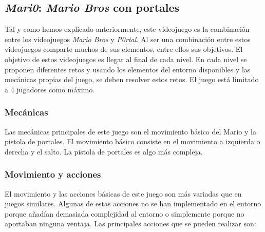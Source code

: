 \subsection{\textit{Mari0}: \textit{Mario Bros} con portales}

Tal y como hemos explicado anteriormente, este videojuego es la combinación entre los videojuegos \textit{Mario Bros} y \textit{P0rtal}. Al ser una combinación entre estos videojuegos comparte muchos de sus elementos, entre ellos sus objetivos. El objetivo de estos videojuegos es llegar al final de cada nivel. En cada nivel se proponen diferentes retos y usando los elementos del entorno disponibles y las mecánicas propias del juego, se deben resolver estos retos. El juego está limitado a 4 jugadores como máximo.

\subsubsection{Mecánicas}

Las mecánicas principales de este juego son el movimiento básico del Mario y la pistola de portales. El movimiento básico consiste en el movimiento a izquierda o derecha y el salto. La pistola de portales es algo más compleja. 

\subsubsection*{Movimiento y acciones}

El movimiento y las acciones básicas de este juego son más variadas que en juegos similares. Algunas de estas acciones no se han implementado en el entorno porque añadían demasiada complejidad al entorno o simplemente porque no aportaban ninguna ventaja. Las principales acciones que se pueden realizar son:

